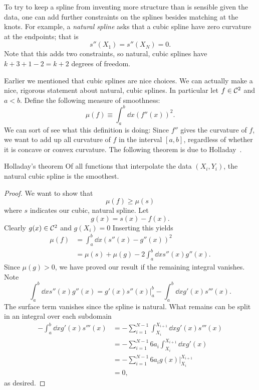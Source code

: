 To try to keep a spline from inventing more structure than is sensible given the
data, one can add further constraints on the splines besides matching at the
knots. For example, a {\it natural spline} asks that
a cubic spline have zero curvature at the endpoints; that is
\begin{equation}
s''(X_1)=s''(X_N)=0.
\end{equation}
Note that this adds two constraints, so natural, cubic splines have
$k+3+1-2=k+2$ degrees of freedom.

Earlier we mentioned that cubic splines are nice choices. We can actually make
a nice, rigorous statement about natural, cubic splines. In particular
let $f\in\mathcal{C}^2$ and $a<b$. Define the following measure of smoothness:
\begin{equation}\label{eq:smoothness}
\mu(f)\equiv\int_a^b \dd{x}(f''(x))^2.
\end{equation}
We can sort of see what this definition is doing: Since $f''$ gives the
curvature of $f$, we want to add up all curvature of $f$ in the interval
$[a,b]$, regardless of whether it is concave or convex curvature.
The following theorem is due to Holladay~\cite{holladay_smoothest_1957}.

\begin{theorem}{Holladay's theorem}{}
Of all functions that interpolate the data $(X_i,Y_i)$, the natural
cubic spline is the smoothest.
\begin{proof}
We want to show that
$$
\mu(f) \geq \mu(s)
$$
where $s$ indicates our cubic, natural spline.
Let
$$
 g(x)=s(x)-f(x).
$$
Clearly
$g(x) \in \mathcal{C}^2$
and $g\left(X_i\right)=0$
Inserting this yields
$$
\begin{aligned}
\mu(f) & =\int_a^b\dd{x}\left(s''(x)-g''(x)\right)^2 \\
& =\mu(s)+\mu(g)-2 \int_a^b\dd{x} s''(x) g''(x).
\end{aligned}
$$
Since $\mu(g)>0$, we have proved our result if the
remaining integral vanishes. Note 
$$
\int_a^b \dd{x}s''(x) g''(x)=\left.g'(x) s''(x)\right|_a^b
-\int_a^b \dd{x} g'(x) s'''(x).
$$
The surface term vanishes since the spline is natural.
What remains can be split in an integral over each subdomain
$$
\begin{aligned}
-\int_a^b \dd{x}g'(x) s'''(x) 
& =-\sum_{i=1}^{N-1} \int_{X_i}^{X_{i+1}}\dd{x} g'(x) s'''(x) \\
& =-\sum_{i=1}^{N-1} 6 a_i \int_{X_i}^{X_{i+1}}\dd{x} g'(x) \\
& =-\sum_{i=1}^{N-1} 6 a_i \left.g(x)\right|_{X_i}^{X_{i+1}}\\
& =0,
\end{aligned}
$$
as desired.
\end{proof}
\end{theorem}

